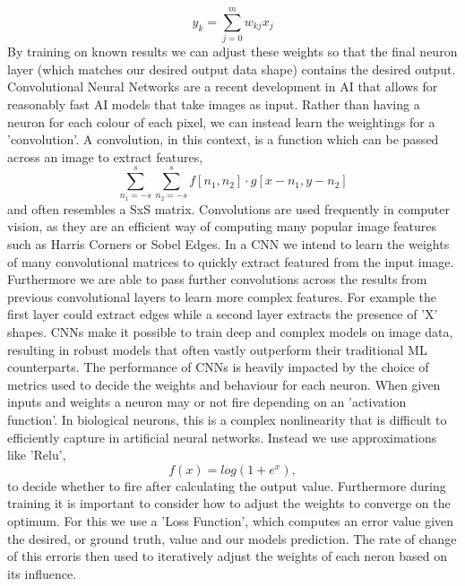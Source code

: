 \documentclass[ %
                    author={Gavin Parker},
                supervisor={Dr. Neill Campbell},
                    degree={MEng},
                     title={Deep Siamese Networks for Illumination Estimation from Stereo Images},
                  subtitle={},
                      type={research},
                      year={2018} ]{dissertation}
\begin{document}
\[y_k = \sum_{j=0}^{m}{w_{kj}x_j}\]
By training on known results we can adjust these weights so that the final neuron layer (which matches our desired output data shape) contains the desired output.
\newline
Convolutional Neural Networks are a recent development in AI that allows for reasonably fast AI models that take images as input. Rather than having a neuron for each colour of each pixel, we can instead learn the weightings for a 'convolution'. A convolution, in this context, is a function which can be passed across an image to extract features,
\[\sum_{n_1=-s}^{s}{\sum_{n_2=-s}^{s}{f[n_1, n_2]\cdot g[x-n_1,y-n_2]}} \]
and often resembles a SxS matrix. Convolutions are used frequently in computer vision, as they are an efficient way of computing many popular image features such as Harris Corners or Sobel Edges. In a CNN we intend to learn the weights of many convolutional matrices to quickly extract featured from the input image. Furthermore we are able to pass further convolutions across the results from previous convolutional layers to learn more complex features. For example the first layer could extract edges while a second layer extracts the presence of 'X' shapes. CNNs make it possible to train deep and complex models on image data, resulting in robust models that often vastly outperform their traditional ML counterparts.
\newline
The performance of CNNs is heavily impacted by the choice of metrics used to decide the weights and behaviour for each neuron. When given inputs and weights a neuron may or not fire depending on an 'activation function'. In biological neurons, this is a complex nonlinearity that is difficult to efficiently capture in artificial neural networks. Instead we use approximations like 'Relu',
\[f(x) = log(1 + e^x),\]
to decide whether to fire after calculating the output value. Furthermore during training it is important to consider how to adjust the weights to converge on the optimum. For this we use a 'Loss Function', which computes an error value given the desired, or ground truth, value and our models prediction. The rate of change of this erroris then used to iteratively adjust the weights of each neron based on its influence.
\newline
\end{document}
